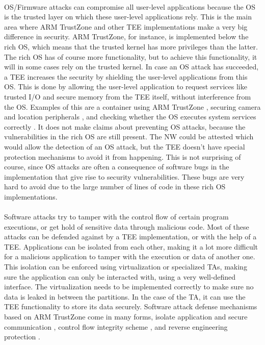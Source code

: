 \paragraph*{}
OS/Firmware attacks can compromise all user-level applications because the OS is the trusted layer on which these user-level applications rely. This is the main area where ARM TrustZone and other TEE implementations make a very big difference in security. ARM TrustZone, for instance, is implemented below the rich OS, which means that the trusted kernel has more privileges than the latter. The rich OS has of course more functionality, but to achieve this functionality, it will in some cases rely on the trusted kernel. In case an OS attack has succeeded, a TEE increases the security by shielding the user-level applications from this OS. This is done by allowing the user-level application to request services like trusted I/O and secure memory from the TEE itself, without interference from the OS. Examples of this are a container using ARM TrustZone \cite{HuaZhichao2021Tpcf}, securing camera and location peripherals \cite{SalmanAmmarS2021SMSG}, and checking whether the OS executes system services correctly \cite{GuanLe2017TSEo}. It does not make claims about preventing OS attacks, because the vulnerabilities in the rich OS are still present. The NW could be attested which would allow the detection of an OS attack, but the TEE doesn't have special protection mechanisms to avoid it from happening. This is not surprising of course, since OS attacks are often a consequence of software bugs in the implementation that give rise to security vulnerabilities. These bugs are very hard to avoid due to the large number of lines of code in these rich OS implementations.

\paragraph*{}
Software attacks try to tamper with the control flow of certain program executions, or get hold of sensitive data through malicious code. Most of these attacks can be defended against by a TEE implementation, or with the help of a TEE. Applications can be isolated from each other, making it a lot more difficult for a malicious application to tamper with the execution or data of another one. This isolation can be enforced using virtualization or specialized TAs, making sure the application can only be interacted with, using a very well-defined interface. The virtualization needs to be implemented correctly to make sure no data is leaked in between the partitions. In the case of the TA, it can use the TEE functionality to store its data securely. Software attack defense mechanisms based on ARM TrustZone come in many forms, isolate application and secure communication \cite{ZhangDiming2020iIfs}, control flow integrity scheme \cite{KawadaTomoaki2020TRCI}, and reverse engineering protection \cite{BenYehudaRaz2019Pare}.

